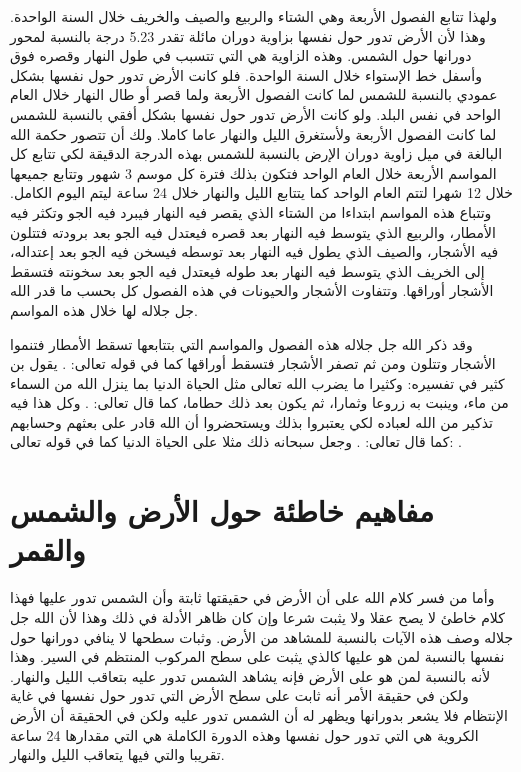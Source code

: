 ولهذا تتابع الفصول الأربعة وهي الشتاء والربيع والصيف والخريف خلال السنة الواحدة. وهذا لأن الأرض تدور حول نفسها بزاوية دوران مائلة تقدر 5.23 درجة بالنسبة لمحور دورانها حول الشمس. وهذه الزاوية هي التي تتسبب في طول النهار وقصره فوق وأسفل خط الإستواء خلال السنة الواحدة. فلو كانت الأرض تدور حول نفسها بشكل عمودي بالنسبة للشمس لما كانت الفصول الأربعة ولما قصر أو طال النهار خلال العام الواحد في نفس البلد. ولو كانت الأرض تدور حول نفسها بشكل أفقي بالنسبة للشمس لما كانت الفصول الأربعة ولأستغرق الليل والنهار عاما كاملا. ولك أن تتصور حكمة الله البالغة في ميل زاوية دوران الإرض بالنسبة للشمس بهذه الدرجة الدقيقة لكي تتابع كل المواسم الأربعة خلال العام الواحد فتكون بذلك فترة كل موسم 3 شهور وتتابع جميعها خلال 12 شهرا لتتم العام الواحد كما يتتابع الليل والنهار خلال 24 ساعة ليتم اليوم الكامل. وتتباع هذه المواسم ابتداءا من الشتاء الذي يقصر فيه النهار فيبرد فيه الجو وتكثر فيه الأمطار، والربيع الذي يتوسط فيه النهار بعد قصره فيعتدل فيه الجو بعد برودته فتتلون فيه الأشجار، والصيف الذي يطول فيه النهار بعد توسطه فيسخن فيه الجو بعد إعتداله، إلى الخريف الذي يتوسط فيه النهار بعد طوله فيعتدل فيه الجو بعد سخونته فتسقط الأشجار أوراقها. وتتفاوت الأشجار والحيونات في هذه الفصول كل بحسب ما قدر الله جل جلاله لها خلال هذه المواسم. 

وقد ذكر الله جل جلاله هذه الفصول والمواسم التي بتتابعها تسقط الأمطار فتنموا الأشجار وتتلون ومن ثم تصفر الأشجار فتسقط أوراقها كما في قوله تعالى: \quranayah*[39][21]{\footnotesize \surahname*[39]}. يقول بن كثير في تفسيره: وكثيرا ما يضرب الله تعالى مثل الحياة الدنيا بما ينزل الله من السماء من ماء، وينبت به زروعا وثمارا، ثم يكون بعد ذلك حطاما، كما قال تعالى: \quranayah*[18][45]{\footnotesize \surahname*[18]} \href{https://shamela.ws/book/8473/3591#p4}{\faExternalLink} \cite{tafsir_ibnKathir}. وكل هذا فيه تذكير من الله لعباده لكي يعتبروا بذلك ويستحضروا أن الله قادر على بعثهم وحسابهم كما قال تعالى: \quranayah*[30][50]{\footnotesize \surahname*[9]}. وجعل سبحانه ذلك مثلا على الحياة الدنيا كما في قوله تعالى: \quranayah*[10][24]{\footnotesize \surahname*[10]}.

\section{مفاهيم خاطئة حول الأرض والشمس والقمر}

وأما من فسر كلام الله على أن الأرض في حقيقتها ثابتة وأن الشمس تدور عليها فهذا كلام خاطئ لا يصح عقلا ولا يثبت شرعا وإن كان ظاهر الأدلة في ذلك وهذا لأن الله جل جلاله وصف هذه الآيات بالنسبة للمشاهد من الأرض. وثبات سطحها لا ينافي دورانها حول نفسها بالنسبة لمن هو عليها كالذي يثبت على سطح المركوب المنتظم في السير. وهذا لأنه بالنسبة لمن هو على الأرض فإنه يشاهد الشمس تدور عليه بتعاقب الليل والنهار. ولكن في حقيقة الأمر أنه ثابت على سطح الأرض التي تدور حول نفسها في غاية الإنتظام فلا يشعر بدورانها ويظهر له أن الشمس تدور عليه ولكن في الحقيقة أن الأرض الكروية هي التي تدور حول نفسها وهذه الدورة الكاملة هي التي مقدارها 24 ساعة تقريبا والتي فيها يتعاقب الليل والنهار.

